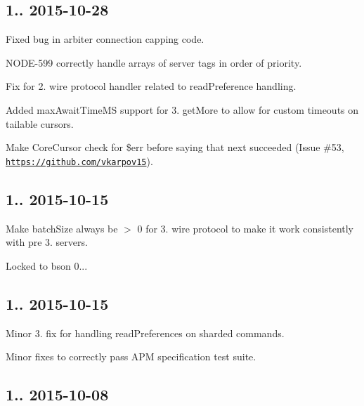 \subsection*{1.. 2015-\/10-\/28 }


\begin{DoxyItemize}
\item Fixed bug in arbiter connection capping code.
\item N\+O\+D\+E-\/599 correctly handle arrays of server tags in order of priority.
\item Fix for 2. wire protocol handler related to read\+Preference handling.
\item Added max\+Await\+Time\+MS support for 3. get\+More to allow for custom timeouts on tailable cursors.
\item Make Core\+Cursor check for \$err before saying that \textquotesingle{}next\textquotesingle{} succeeded (Issue \#53, \href{https://github.com/vkarpov15}{\tt https\+://github.\+com/vkarpov15}).
\end{DoxyItemize}

\subsection*{1.. 2015-\/10-\/15 }


\begin{DoxyItemize}
\item Make batch\+Size always be $>$ 0 for 3. wire protocol to make it work consistently with pre 3. servers.
\item Locked to bson 0...
\end{DoxyItemize}

\subsection*{1.. 2015-\/10-\/15 }


\begin{DoxyItemize}
\item Minor 3. fix for handling read\+Preferences on sharded commands.
\item Minor fixes to correctly pass A\+PM specification test suite.
\end{DoxyItemize}

\subsection*{1.. 2015-\/10-\/08 }


